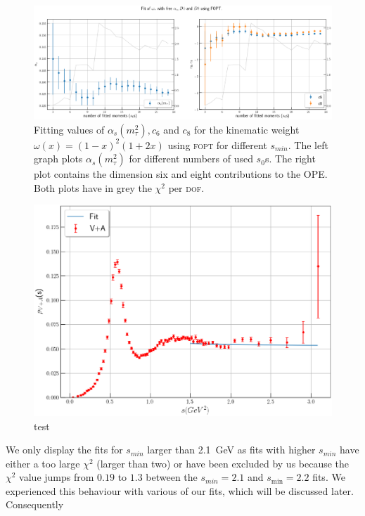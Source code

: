 \documentclass[../../index.tex]{subfiles}
\begin{document}
\begin{figure}
  \centering \includegraphics[width=\textwidth]{./images/fitWKinAlD6D8.eps}
  \caption{Fitting values of \(\alpha_s(m_\tau^2), c_6\) and \(c_8\) for the
    kinematic weight \(\omega(x)=(1-x)^2(1+2x)\) using \textsc{fopt} for
    different \(s_{min}\). The left graph plots \(\alpha_s(m_\tau^2)\) for
    different numbers of used \(s_0\)s. The right plot contains the dimension
    six and eight contributions to the OPE. Both plots have in grey the
    \(\chi^2\) per \textsc{dof}.}
  \label{fig:fitWKinAlD6D8}
\end{figure}
\begin{figure}
  \centering
  \includegraphics[width=\textwidth]{./images/fitWKinAlD6D8SpecFunc.eps}
  \caption{test}
\end{figure}
We only display the fits for \(s_{min}\) larger than \SI{2.1}{\giga\eV} as fits
with higher \(s_{min}\) have either a too large \(\chi^2\) (larger than two) or
have been excluded by us because the \(\chi^2\) value jumps from \(0.19\) to
\(1.3\) between the \(s_{min}=2.1\) and \(s_\min=2.2\) fits. We experienced this
behaviour with various of our fits, which will be discussed later. Consequently
\end{document}
